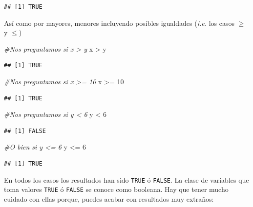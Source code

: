 \documentclass[
]{book}
\newenvironment{Shaded}{\begin{snugshade}}{\end{snugshade}}
\newcommand{\CommentTok}[1]{\textcolor[rgb]{0.56,0.35,0.01}{\textit{#1}}}
\newcommand{\DecValTok}[1]{\textcolor[rgb]{0.00,0.00,0.81}{#1}}
\newcommand{\NormalTok}[1]{#1}
\newcommand{\SpecialCharTok}[1]{\textcolor[rgb]{0.00,0.00,0.00}{#1}}
\begin{document}
\begin{verbatim}
## [1] TRUE
\end{verbatim}

Así como por mayores, menores incluyendo posibles igualdades (\emph{i.e.} los casos \(\geq\) y \(\leq\))

\begin{Shaded}
\begin{Highlighting}[]
\CommentTok{\#Nos preguntamos si x \textgreater{} y}
\NormalTok{x }\SpecialCharTok{\textgreater{}}\NormalTok{ y}
\end{Highlighting}
\end{Shaded}

\begin{verbatim}
## [1] TRUE
\end{verbatim}

\begin{Shaded}
\begin{Highlighting}[]
\CommentTok{\#Nos preguntamos si x \textgreater{}= 10}
\NormalTok{x }\SpecialCharTok{\textgreater{}=} \DecValTok{10}
\end{Highlighting}
\end{Shaded}

\begin{verbatim}
## [1] TRUE
\end{verbatim}

\begin{Shaded}
\begin{Highlighting}[]
\CommentTok{\#Nos preguntamos si y \textless{} 6}
\NormalTok{y }\SpecialCharTok{\textless{}} \DecValTok{6}
\end{Highlighting}
\end{Shaded}

\begin{verbatim}
## [1] FALSE
\end{verbatim}

\begin{Shaded}
\begin{Highlighting}[]
\CommentTok{\#O bien si y \textless{}= 6}
\NormalTok{y }\SpecialCharTok{\textless{}=} \DecValTok{6}
\end{Highlighting}
\end{Shaded}

\begin{verbatim}
## [1] TRUE
\end{verbatim}

En todos los casos los resultados han sido \texttt{TRUE} ó \texttt{FALSE}. La clase de variables que toma valores \texttt{TRUE} ó \texttt{FALSE} se conoce como booleana. Hay que tener mucho cuidado con ellas porque, puedes acabar con resultados muy extraños:
\end{document}

